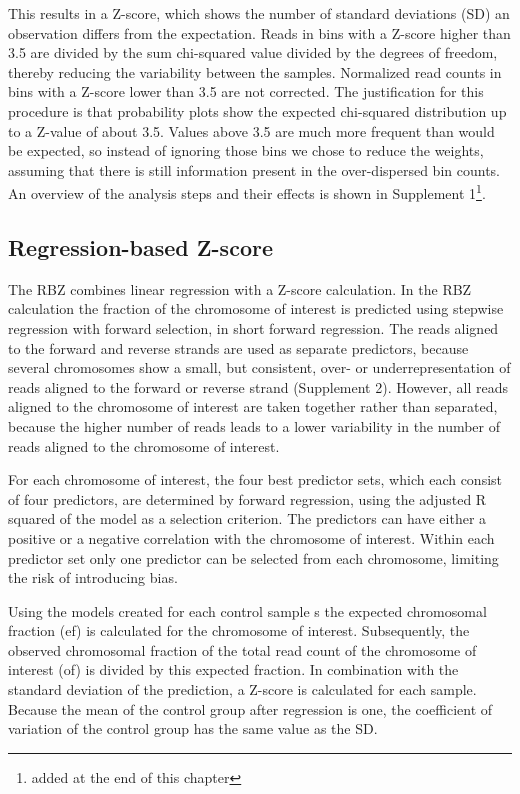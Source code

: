 \noindent This results in a Z-score, which shows the number of standard deviations (SD) an observation differs from the expectation. 
Reads in bins with a Z-score higher than 3.5 are divided by the sum chi-squared value divided by the degrees of freedom, thereby reducing the variability between the samples. 
Normalized read counts in bins with a Z-score lower than 3.5 are not corrected. 
The justification for this procedure is that probability plots show the expected chi-squared distribution up to a Z-value of about 3.5. 
Values above 3.5 are much more frequent than would be expected, so instead of ignoring those bins we chose to reduce the weights, assuming that there is still information present in the over-dispersed bin counts. 
An overview of the analysis steps and their effects is shown in Supplement 1\footnote{added at the end of this chapter}.

\subsection{Regression-based Z-score}
The RBZ combines linear regression with a Z-score calculation. 
In the RBZ calculation the fraction of the chromosome of interest is predicted using stepwise regression with forward selection, in short forward regression. 
The reads aligned to the forward and reverse strands are used as separate predictors, because several chromosomes show a small, but consistent, over- or underrepresentation of reads aligned to the forward or reverse strand (Supplement 2). 
However, all reads aligned to the chromosome of interest are taken together rather than separated, because the higher number of reads leads to a lower variability in the number of reads aligned to the chromosome of interest.

For each chromosome of interest, the four best predictor sets, which each consist of four predictors, are determined by forward regression, using the adjusted R squared of the model as a selection criterion. 
The predictors can have either a positive or a negative correlation with the chromosome of interest. 
Within each predictor set only one predictor can be selected from each chromosome, limiting the risk of introducing bias.

Using the models created for each control sample s the expected chromosomal fraction (ef) is calculated for the chromosome of interest. 
Subsequently, the observed chromosomal fraction of the total read count of the chromosome of interest (of) is divided by this expected fraction. 
In combination with the standard deviation of the prediction, a Z-score is calculated for each sample. 
Because the mean of the control group after regression is one, the coefficient of variation of the control group has the same value as the SD.


